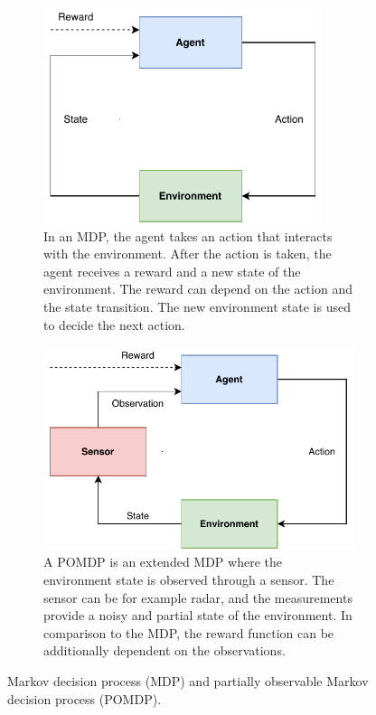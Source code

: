 \documentclass[english, 12pt, a4paper, elec, utf8, a-1b, online]{aaltothesis}
\begin{document}
\begin{figure}
    \centering
    \begin{subfigure}[b]{0.45\textwidth}
        \centering
        \includegraphics[width=0.9\textwidth]{figures/MDP.pdf}
        \caption{
        In an MDP, the agent takes an action that interacts with the environment.
        After the action is taken, the agent receives a reward and a new state of the environment.
        The reward can depend on the action and the state transition.
        The new environment state is used to decide the next action.}
        \label{fig:mdp}
    \end{subfigure}
    \hfill
    \begin{subfigure}[b]{0.45\textwidth}
        \centering
        \includegraphics[width=\textwidth]{figures/POMDP.pdf}
        \caption{
        A POMDP is an extended MDP where the environment state is observed through a sensor.
        The sensor can be for example radar, and the measurements provide a noisy and partial state of the environment. 
        In comparison to the MDP, the reward function can be additionally dependent on the observations.
        }
        \label{fig:pomdp}
    \end{subfigure}
    \caption{Markov decision process (MDP) and partially observable Markov decision process (POMDP). }
    \label{fig:MDP_and_POMDP}
\end{figure}
\end{document}
